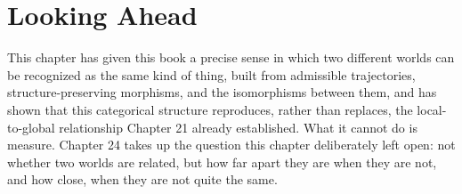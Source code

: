 \section{Looking Ahead}

This chapter has given this book a precise sense in which two different worlds can be recognized as the same kind of thing, built from admissible trajectories, structure-preserving morphisms, and the isomorphisms between them, and has shown that this categorical structure reproduces, rather than replaces, the local-to-global relationship Chapter 21 already established. What it cannot do is measure. Chapter 24 takes up the question this chapter deliberately left open: not whether two worlds are related, but how far apart they are when they are not, and how close, when they are not quite the same.
